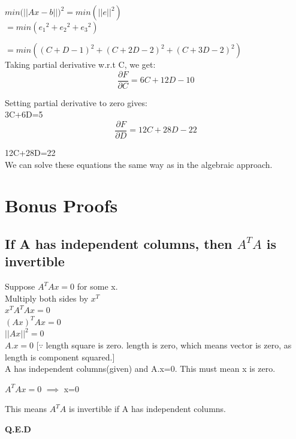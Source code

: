 \documentclass[]{article}
\begin{document}
\noindent
$min({||Ax-b||)}^2=min({||e||}^2)$\\

\noindent
$=min({e_1}^2+{e_2}^2+{e_3}^2)$

\noindent
$=min({(C+D-1)}^2+{(C+2D-2)}^2+{(C+3D-2)}^2)$\\

\noindent
Taking partial derivative w.r.t C, we get:\\

\noindent
\begin{equation}
	\frac{\partial F}{\partial C} = 6C+12D-10
\end{equation}

\noindent
Setting partial derivative to zero gives:\\

\noindent
3C+6D=5\\

\noindent
\begin{equation}
	\frac{\partial F}{\partial D} = 12C+28D-22
\end{equation}

\noindent
12C+28D=22\\

\noindent
We can solve these equations the same way as in the algebraic approach.

\vspace{10pt}
\section{Bonus Proofs}
\vspace{10pt}
\subsection{If A has independent columns, then $A^TA$ is invertible}
\vspace{10pt}
Suppose $A^TAx=0$ for some x.\\

\noindent
Multiply both sides by $x^T$\\

\noindent
$x^TA^TAx=0$\\
${(Ax)}^TAx=0$\\
$||Ax||^2=0$\\
$A.x=0$ [$\because$ length square is zero. length is zero, which means vector is zero, as length is component squared.]\\

\noindent
A has independent columns(given) and A.x=0. This must mean x is zero.

\noindent
$A^TAx=0$ $\implies$ x=0

\noindent
This means $A^TA$ is invertible if A has independent columns.

\noindent
\textbf{Q.E.D}
\end{document}
